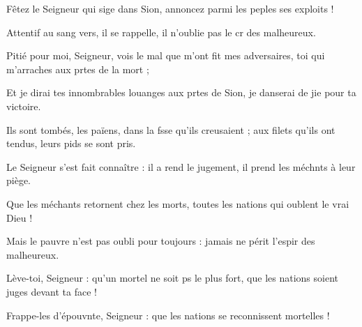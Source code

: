 \item Fêtez le Seigneur qui sige dans Sion,\psstar{} annoncez parmi les peples ses exploits !
\item Attentif au sang vers, il se rappelle,\psstar{} il n’oublie pas le cr des malheureux.
\item Pitié pour moi, Seigneur, vois le mal que m’ont fit mes adversaires,\psstar{} toi qui m’arraches aux prtes de la mort ;
\item Et je dirai tes innombrables louanges aux prtes de Sion,\psstar{} je danserai de jie pour ta victoire.
\item Ils sont tombés, les païens, dans la fsse qu’ils creusaient ;\psstar{} aux filets qu’ils ont tendus, leurs pids se sont pris.
\item Le Seigneur s’est fait connaître : il a rend le jugement,\psstar{} il prend les méchnts à leur piège.
\item Que les méchants retornent chez les morts,\psstar{} toutes les nations qui oublent le vrai Dieu !
\item Mais le pauvre n’est pas oubli pour toujours :\psstar{} jamais ne périt l’espir des malheureux.
\item Lève-toi, Seigneur : qu’un mortel ne soit ps le plus fort,\psstar{} que les nations soient juges devant ta face !
\item Frappe-les d’épouvnte, Seigneur :\psstar{} que les nations se reconnissent mortelles !
